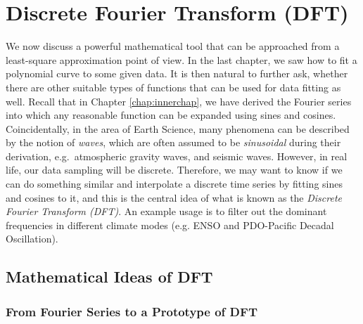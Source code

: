 \chapter{Discrete Fourier Transform (DFT)}
\label{chap:DFT}
We now discuss a powerful mathematical tool that can be approached from a least-square approximation point of view. In the last chapter, we saw how to fit a polynomial curve to some given data. It is then natural to further ask, whether there are other suitable types of functions that can be used for data fitting as well. Recall that in Chapter \ref{chap:innerchap}, we have derived the Fourier series into which any reasonable function can be expanded using sines and cosines. Coincidentally, in the area of Earth Science, many phenomena can be described by the notion of \textit{waves}, which are often assumed to be \textit{sinusoidal} during their derivation, e.g.\ atmospheric gravity waves, and seismic waves. However, in real life, our data sampling will be discrete. Therefore, we may want to know if we can do something similar and interpolate a discrete time series by fitting sines and cosines to it, and this is the central idea of what is known as the \textit{Discrete Fourier Transform (DFT)}. An example usage is to filter out the dominant frequencies in different climate modes (e.g. ENSO and PDO-Pacific Decadal Oscillation).

\section{Mathematical Ideas of DFT}
\label{section:DFT}

\subsection{From Fourier Series to a Prototype of DFT}
\label{section:FouriertoDFT}

